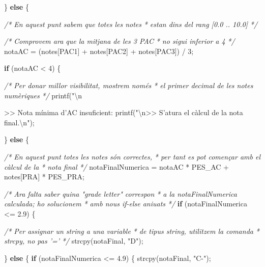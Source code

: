 \documentclass[]{book}
\newenvironment{Shaded}{\begin{snugshade}}{\end{snugshade}}
\newcommand{\DecValTok}[1]{\textcolor[rgb]{0.00,0.00,0.81}{#1}}
\newcommand{\FloatTok}[1]{\textcolor[rgb]{0.00,0.00,0.81}{#1}}
\newcommand{\SpecialCharTok}[1]{\textcolor[rgb]{0.00,0.00,0.00}{#1}}
\newcommand{\StringTok}[1]{\textcolor[rgb]{0.31,0.60,0.02}{#1}}
\newcommand{\CommentTok}[1]{\textcolor[rgb]{0.56,0.35,0.01}{\textit{#1}}}
\newcommand{\ControlFlowTok}[1]{\textcolor[rgb]{0.13,0.29,0.53}{\textbf{#1}}}
\newcommand{\NormalTok}[1]{#1}
\begin{document}
\begin{Shaded}
\begin{Highlighting}[]
{{{{{{{\NormalTok{    \} }\ControlFlowTok{else}\NormalTok{ \{}

        \CommentTok{/* En aquest punt sabem que totes les notes}
\CommentTok{         * estan dins del rang [0.0 .. 10.0]}
\CommentTok{         */}

        \CommentTok{/* Comprovem ara que la mitjana de les 3 PAC }
\CommentTok{         * no sigui inferior a 4}
\CommentTok{         */}
\NormalTok{        notaAC = (notes[PAC1] + notes[PAC2] + notes[PAC3]) / }\DecValTok{3}\NormalTok{;}

        \ControlFlowTok{if}\NormalTok{ (notaAC < }\DecValTok{4}\NormalTok{) \{}

           \CommentTok{/* Per donar millor visibilitat, mostrem només}
\CommentTok{            * el primer decimal de les notes numèriques}
\CommentTok{            */}
\NormalTok{           printf(}\StringTok{"}\SpecialCharTok{\textbackslash{}n}\StringTok{>> Nota mínima d'AC insuficient: %
\NormalTok{           printf(}\StringTok{"}\SpecialCharTok{\textbackslash{}n}\StringTok{>> S'atura el càlcul de la nota final.}\SpecialCharTok{\textbackslash{}n}\StringTok{"}\NormalTok{);}

\NormalTok{        \} }\ControlFlowTok{else}\NormalTok{ \{}

            \CommentTok{/* En aquest punt totes les notes són correctes,}
\CommentTok{             * per tant es pot començar amb el càlcul de la }
\CommentTok{             * nota final}
\CommentTok{             */}
\NormalTok{            notaFinalNumerica = notaAC * PES_AC + notes[PRA] * PES_PRA;}

            \CommentTok{/* Ara falta saber quina "grade letter" correspon}
\CommentTok{             * a la notaFinalNumerica calculada; ho solucionem}
\CommentTok{             * amb nous if-else aniuats}
\CommentTok{             */}
            \ControlFlowTok{if}\NormalTok{ (notaFinalNumerica <= }\FloatTok{2.9}\NormalTok{) \{}

                \CommentTok{/* Per assignar un string a una variable}
\CommentTok{                 * de tipus string, utilitzem la comanda}
\CommentTok{                 * strcpy, no pas '='}
\CommentTok{                 */}
\NormalTok{                strcpy(notaFinal, }\StringTok{"D"}\NormalTok{);}

\NormalTok{            \} }\ControlFlowTok{else}\NormalTok{ \{}
                \ControlFlowTok{if}\NormalTok{ (notaFinalNumerica <= }\FloatTok{4.9}\NormalTok{) \{}
\NormalTok{                    strcpy(notaFinal, }\StringTok{"C-"}\NormalTok{);}

}}}}}}}}
\end{Highlighting}
\end{Shaded}
\end{document}
